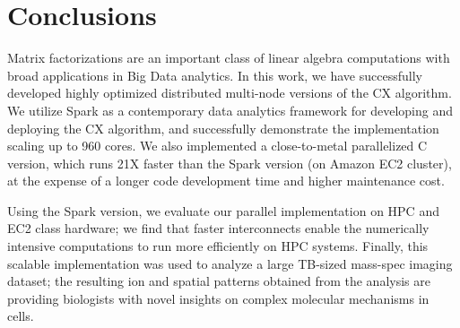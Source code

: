 \section{Conclusions}
\label{sec:conclusion}

Matrix factorizations are an important class of linear algebra computations
with broad applications in Big Data analytics. In this work, we have
successfully developed highly optimized distributed multi-node
versions of the CX algorithm.
We utilize
Spark as a contemporary data analytics framework for developing and deploying
the CX algorithm, and successfully demonstrate the implementation scaling up to
960 cores. 
We also implemented a close-to-metal parallelized C version, which runs 21X
faster than the Spark version (on Amazon EC2 cluster), at the expense of a longer code development
time and higher maintenance cost.

Using the Spark version, we evaluate our parallel implementation on HPC and EC2 class
hardware; we find that faster interconnects enable the numerically intensive
computations to run more efficiently on HPC systems. Finally, this scalable
implementation was used to analyze a large TB-sized mass-spec imaging
dataset; the resulting ion and spatial patterns obtained from the analysis are
providing biologists with novel insights on complex molecular mechanisms in
cells. 

